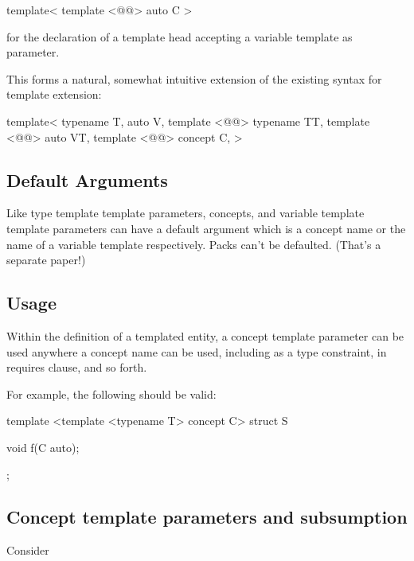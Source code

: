 \documentclass{wg21}
\begin{document}
\begin{colorblock}
template<
    template <@@> auto C
>
\end{colorblock}

for the declaration of a template head accepting a variable template as parameter.

This forms a natural, somewhat intuitive extension of the existing syntax for template extension:
\begin{colorblock}
template<
    typename T,
    auto V,
    template <@@> typename TT,
    template <@@> auto VT,
    template <@@> concept C,
>
\end{colorblock}

\subsection{Default Arguments}

Like type template template parameters, concepts, and variable template template
parameters can have a default argument which is a concept name or the name of a variable template respectively.
Packs can't be defaulted. (That's a separate paper!)

\subsection{Usage}

Within the definition of a templated entity, a concept template parameter
can be used anywhere a concept name can be used, including as a type constraint, in requires clause, and so forth.

For example, the following should be valid:

\begin{colorblock}
template <template <typename T> concept C>
struct S {
    void f(C auto);

};
\end{colorblock}

\subsection{Concept template parameters and subsumption}

Consider
\end{document}
